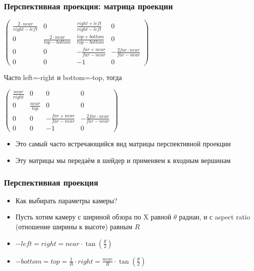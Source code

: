 \documentclass{beamer}
\begin{document}
\begin{frame}[fragile]
\frametitle{Перспективная проекция: матрица проекции}
\begin{center}
\begin{math}
\begin{pmatrix}
\frac{2\cdot near}{right - left} & 0 & \frac{right + left}{right - left} & 0 \\
0 & \frac{2\cdot near}{top - bottom} & \frac{top + bottom}{top - bottom} & 0 \\
0 & 0 & -\frac{far + near}{far - near} & -\frac{2 far \cdot near}{far - near} \\
0 & 0 & -1 & 0
\end{pmatrix}
\end{math}
\end{center}

\pause
Часто left=-right и bottom=-top, тогда

\begin{center}
\begin{math}
\begin{pmatrix}
\frac{near}{right} & 0 & 0 & 0 \\
0 & \frac{near}{top} & 0 & 0 \\
0 & 0 & -\frac{far + near}{far - near} & -\frac{2 far \cdot near}{far - near} \\
0 & 0 & -1 & 0
\end{pmatrix}
\end{math}
\end{center}
\begin{itemize}
\item Это самый часто встречающийся вид матрицы перспективной проекции
\pause
\item Эту матрицы мы передаём в шейдер и применяем к входным вершинам
\end{itemize}
\end{frame}

\begin{frame}[fragile]
\frametitle{Перспективная проекция}
\begin{itemize}
\item Как выбирать параметры камеры?
\pause
\item Пусть хотим камеру с шириной обзора по X равной \begin{math}\theta\end{math} радиан, и с aspect ratio (отношение ширины к высоте) равным \begin{math}R\end{math}
\pause
\item \begin{math}-left=right=near \cdot \tan\left(\frac{\theta}{2}\right)\end{math}
\item \begin{math}-bottom=top=\frac{1}{R} \cdot right = \frac{near}{R} \cdot \tan\left(\frac{\theta}{2}\right)\end{math}
\end{itemize}
\end{frame}
\end{document}
